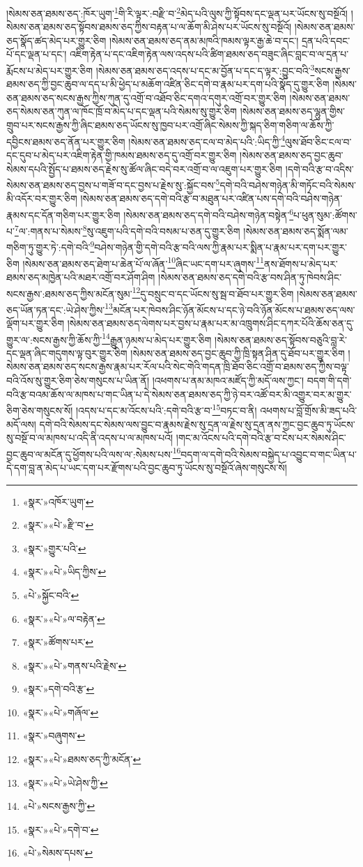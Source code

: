 །སེམས་ཅན་ཐམས་ཅད་:ཁོར་ཡུག་\footnote{«སྣར་»འཁོར་ཡུག་}གི་རི་ལྟར་:བརྫི་བ་\footnote{«སྣར་»«པེ་»རྫི་བ་}མེད་པའི་ལུས་ཀྱི་སྟོབས་དང་ལྡན་པར་ཡོངས་སུ་བསྔོའོ། །སེམས་ཅན་ཐམས་ཅད་སྟོབས་ཐམས་ཅད་ཀྱིས་བརྟན་པ་ལ་ཆོག་མི་ཤེས་པར་ཡོངས་སུ་བསྔོའོ། །སེམས་ཅན་ཐམས་ཅད་སྣོད་ཚད་མེད་པར་གྱུར་ཅིག །སེམས་ཅན་ཐམས་ཅད་ནམ་མཁའི་ཁམས་ལྟར་རྒྱ་ཆེ་བ་དང་། དྲན་པའི་དབང་པོ་དང་ལྡན་པ་དང་། འཇིག་རྟེན་པ་དང་འཇིག་རྟེན་ལས་འདས་པའི་ཚིག་ཐམས་ཅད་བཟུང་ཞིང་བླང་བ་ལ་དྲན་པ་རྨོངས་པ་མེད་པར་གྱུར་ཅིག །སེམས་ཅན་ཐམས་ཅད་འདས་པ་དང་མ་བྱོན་པ་དང་ད་ལྟར་:བྱུང་བའི་\footnote{«སྣར་»གྱུར་པའི་}སངས་རྒྱས་ཐམས་ཅད་ཀྱི་བྱང་ཆུབ་ལ་དད་པ་མི་ཕྱེད་པ་མཆོག་འཛིན་ཅིང་དགེ་བ་རྣམ་པར་དག་པའི་སྣོད་དུ་གྱུར་ཅིག །སེམས་ཅན་ཐམས་ཅད་སངས་རྒྱས་ཀྱིས་ཀུན་དུ་འགྲོ་བ་འཐོབ་ཅིང་དགའ་དགུར་འགྲོ་བར་གྱུར་ཅིག །སེམས་ཅན་ཐམས་ཅད་སེམས་ཅན་ཀུན་ལ་ཁོང་ཁྲོ་བ་མེད་པ་དང་ལྡན་པའི་སེམས་སུ་གྱུར་ཅིག །སེམས་ཅན་ཐམས་ཅད་ལྷུན་གྱིས་གྲུབ་པར་སངས་རྒྱས་ཀྱི་ཞིང་ཐམས་ཅད་ཡོངས་སུ་ཁྱབ་པར་འགྲོ་ཞིང་སེམས་ཀྱི་སྐད་ཅིག་གཅིག་ལ་ཆོས་ཀྱི་དབྱིངས་ཐམས་ཅད་ནོན་པར་གྱུར་ཅིག །སེམས་ཅན་ཐམས་ཅད་ངལ་བ་མེད་པའི་:ཡིད་ཀྱི་\footnote{«སྣར་»«པེ་»ཡིད་ཀྱིས་}ལུས་ཐོབ་ཅིང་ངལ་བ་དང་དུབ་པ་མེད་པར་འཇིག་རྟེན་གྱི་ཁམས་ཐམས་ཅད་དུ་འགྲོ་བར་གྱུར་ཅིག །སེམས་ཅན་ཐམས་ཅད་བྱང་ཆུབ་སེམས་དཔའི་སྤྱོད་པ་ཐམས་ཅད་རྗེས་སུ་ཚོལ་ཞིང་བདེ་བར་འགྲོ་བ་ལ་འཇུག་པར་གྱུར་ཅིག །དགེ་བའི་རྩ་བ་འདིས་སེམས་ཅན་ཐམས་ཅད་བྱས་པ་གཟོ་བ་དང་བྱས་པ་རྗེས་སུ་:སྐྱོང་བས་\footnote{«པེ་»སྐྱོང་བའི་}དགེ་བའི་བཤེས་གཉེན་མི་གཏོང་བའི་སེམས་མི་འདོར་བར་གྱུར་ཅིག །སེམས་ཅན་ཐམས་ཅད་དགེ་བའི་རྩ་བ་མཐུན་པར་འཛིན་པས་དགེ་བའི་བཤེས་གཉེན་རྣམས་དང་དོན་གཅིག་པར་གྱུར་ཅིག །སེམས་ཅན་ཐམས་ཅད་དགེ་བའི་བཤེས་གཉེན་བསྟེན་\footnote{«སྣར་»«པེ་»ལ་བརྟེན་}པ་ཕུན་སུམ་:ཚོགས་པ་\footnote{«སྣར་»ཚོགས་པར་}ལ་:གནས་པ་སེམས་\footnote{«སྣར་»«པེ་»གནས་པའི་རྗེས་}སུ་འཇུག་པའི་དགེ་བའི་བསམ་པ་ཅན་དུ་གྱུར་ཅིག །སེམས་ཅན་ཐམས་ཅད་སྨོན་ལམ་གཅིག་ཏུ་གྱུར་ཏེ་:དགེ་བའི་\footnote{«སྣར་»དགེ་བའི་རྩ་}བཤེས་གཉེན་གྱི་དགེ་བའི་རྩ་བའི་ལས་ཀྱི་རྣམ་པར་སྨིན་པ་རྣམ་པར་དག་པར་གྱུར་ཅིག །སེམས་ཅན་ཐམས་ཅད་ཐེག་པ་ཆེན་པོ་ལ་ཞོན་\footnote{«སྣར་»«པེ་»གཞོལ་}ཞིང་ཡང་དག་པར་ཞུགས་\footnote{«སྣར་»བཞུགས་}ནས་ཐོགས་པ་མེད་པར་ཐམས་ཅད་མཁྱེན་པའི་མཐར་འགྲོ་བར་ཤོག་ཤིག །སེམས་ཅན་ཐམས་ཅད་དགེ་བའི་རྩ་བས་ཤིན་ཏུ་ཁེབས་ཤིང་སངས་རྒྱས་:ཐམས་ཅད་ཀྱིས་མངོན་སུམ་\footnote{«སྣར་»«པེ་»ཐམས་ཅད་ཀྱི་མངོན་}དུ་བསྲུང་བ་དང་ཡོངས་སུ་སྦ་བ་ཐོབ་པར་གྱུར་ཅིག །སེམས་ཅན་ཐམས་ཅད་ཡོན་ཏན་དང་:ཡེ་ཤེས་ཀྱིས་\footnote{«སྣར་»«པེ་»ཡེ་ཤེས་ཀྱི་}མངོན་པར་ཁེབས་ཤིང་ཉོན་མོངས་པ་དང་ཉེ་བའི་ཉོན་མོངས་པ་ཐམས་ཅད་ལས་ལྡོག་པར་གྱུར་ཅིག །སེམས་ཅན་ཐམས་ཅད་ལེགས་པར་བྱས་པ་རྣམ་པར་མ་འཁྲུགས་ཤིང་དཀར་པོའི་ཆོས་ཅན་དུ་གྱུར་ལ་:སངས་རྒྱས་ཀྱི་ཆོས་ཀྱི་\footnote{«པེ་»སངས་རྒྱས་ཀྱི་}རྒྱུན་ཉམས་པ་མེད་པར་གྱུར་ཅིག །སེམས་ཅན་ཐམས་ཅད་སྟོབས་བཅུའི་བླ་རེ་དང་ལྡན་ཞིང་གདུགས་ལྟ་བུར་གྱུར་ཅིག །སེམས་ཅན་ཐམས་ཅད་བྱང་ཆུབ་ཀྱི་ཁྲི་སྟན་ཤིན་དུ་ཐོབ་པར་གྱུར་ཅིག །སེམས་ཅན་ཐམས་ཅད་སངས་རྒྱས་རྣམ་པར་རོལ་པའི་སེང་གེའི་གདན་ཁྲི་ཐོབ་ཅིང་འགྲོ་བ་ཐམས་ཅད་ཀྱིས་བལྟ་བའི་འོས་སུ་གྱུར་ཅིག་ཅེས་གསུངས་པ་ཡིན་ནོ། །འཕགས་པ་ནམ་མཁའ་མཛོད་ཀྱི་མདོ་ལས་ཀྱང་། བདག་གི་དགེ་བའི་རྩ་བའམ་ཆོས་ལ་མཁས་པ་གང་ཡིན་པ་དེ་སེམས་ཅན་ཐམས་ཅད་ཀྱི་ཉེ་བར་འཚོ་བར་མི་འགྱུར་བར་མ་གྱུར་ཅིག་ཅེས་གསུངས་སོ། །འདས་པ་དང་མ་འོངས་པའི་:དགེ་བའི་རྩ་བ་\footnote{«སྣར་»«པེ་»དགེ་བ་}བཏང་བ་ནི། འཕགས་པ་བློ་གྲོས་མི་ཟད་པའི་མདོ་ལས། དགེ་བའི་སེམས་དང་སེམས་ལས་བྱུང་བ་རྣམས་རྗེས་སུ་དྲན་ལ་རྗེས་སུ་དྲན་ནས་ཀྱང་བྱང་ཆུབ་ཏུ་ཡོངས་སུ་བསྔོ་བ་ལ་མཁས་པ་འདི་ནི་འདས་པ་ལ་མཁས་པའོ། །གང་མ་འོངས་པའི་དགེ་བའི་རྩ་བ་ངེས་པར་སེམས་ཤིང་བྱང་ཆུབ་ལ་མངོན་དུ་ཕྱོགས་པའི་ལས་ལ་:སེམས་པས་\footnote{«པེ་»སེམས་དཔས་}བདག་ལ་དགེ་བའི་སེམས་བསྐྱེད་པ་འབྱུང་བ་གང་ཡིན་པ་དེ་དག་བླ་ན་མེད་པ་ཡང་དག་པར་རྫོགས་པའི་བྱང་ཆུབ་ཏུ་ཡོངས་སུ་བསྔོའོ་ཞེས་གསུངས་སོ། 